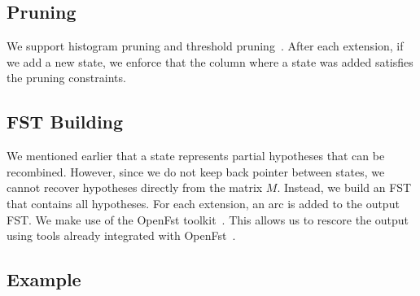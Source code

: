\subsection{Pruning}

We support histogram pruning and threshold pruning~\citep{koehn:2010:book}.
After each extension, if we add a new state, we enforce that the column where
a state was added satisfies the pruning constraints.

\subsection{FST Building}

We mentioned earlier that a state represents partial hypotheses that can
be recombined. However, since we do not keep back pointer between states,
we cannot recover hypotheses directly from the matrix $M$.
Instead, we build an FST that contains all hypotheses. For each extension,
an arc is added to the output FST. We make use of the OpenFst
toolkit~\citep{allauzen-riley-schalkwyk-skut-mohri:2007:CIAA}.
This allows us to rescore the output using tools already integrated
with OpenFst~\citep{blackwood:2010:PHD}.

\subsection{Example}

